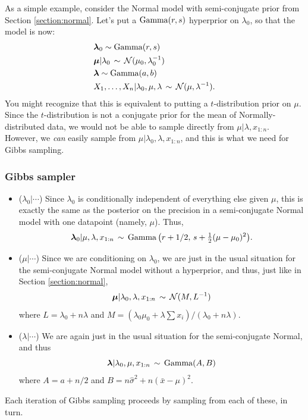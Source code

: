 \documentclass[12pt]{article}
\begin{document}
As a simple example, consider the Normal model with semi-conjugate prior from Section \ref{section:normal}. Let's put a $\operatorname*{Gamma}(r,s)$ hyperprior
on $\lambda_0$, so that the model is now:
\begin{align*}
& \bm\lambda_0 \sim \operatorname*{Gamma}(r,s)\\
& \bm\mu|\lambda_0\,\sim\,\mathcal{N}(\mu_0,\lambda_0^{-1})\\
& \bm\lambda \sim \operatorname*{Gamma}(a,b)\\
& X_1,\ldots,X_n|\lambda_0,\mu,\lambda\,\sim\,\mathcal{N}(\mu,\lambda^{-1}).
\end{align*}
You might recognize that this is equivalent to putting a $t$-distribution prior on $\mu$. Since the $t$-distribution is not a conjugate prior
for the mean of Normally-distributed data, we would not be able to sample directly from $\mu|\lambda,x_{1:n}$.  However, we \textit{can}
easily sample from $\mu|\lambda_0,\lambda,x_{1:n}$, and this is what we need for Gibbs sampling.

\subsubsection{Gibbs sampler}
\begin{itemize}
    \item ($\lambda_0|\cdots$) Since $\lambda_0$ is conditionally independent of everything else given $\mu$, this is exactly the same as
        the posterior on the precision in a semi-conjugate Normal model with one datapoint (namely, $\mu$). Thus,
        $$\bm\lambda_0|\mu,\lambda,x_{1:n} \,\sim\, \operatorname*{Gamma}\big(r+1/2,\,s+\tfrac{1}{2}(\mu-\mu_0)^2\big).$$
    \item ($\mu|\cdots$) Since we are conditioning on $\lambda_0$, we are just in the usual situation for the semi-conjugate Normal
        model without a hyperprior, and thus, just like in Section \ref{section:normal},
        $$\bm\mu|\lambda_0,\lambda,x_{1:n}\, \sim \,\mathcal{N}(M,L^{-1})$$
        where $L =\lambda_0+ n\lambda$ and $M =(\lambda_0\mu_0+\lambda\sum x_i)/(\lambda_0+ n\lambda)$.
    \item ($\lambda|\cdots$) We are again just in the usual situation for the semi-conjugate Normal, and thus
        $$\bm\lambda|\lambda_0,\mu,x_{1:n}\,\sim\,\operatorname*{Gamma}(A,B)$$
        where $A = a + n/2$ and $B = n\hat\sigma^2 + n (\bar x-\mu)^2$.
\end{itemize}
Each iteration of Gibbs sampling proceeds by sampling from each of these, in turn.
\end{document}
